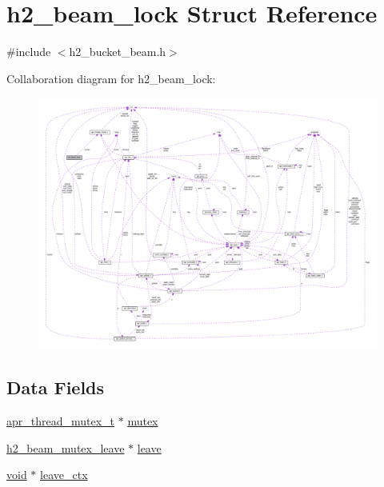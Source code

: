 \hypertarget{structh2__beam__lock}{}\section{h2\+\_\+beam\+\_\+lock Struct Reference}
\label{structh2__beam__lock}


{\ttfamily \#include $<$h2\+\_\+bucket\+\_\+beam.\+h$>$}



Collaboration diagram for h2\+\_\+beam\+\_\+lock\+:
\nopagebreak
\begin{figure}[H]
\begin{center}
\leavevmode
\includegraphics[width=350pt]{structh2__beam__lock__coll__graph}
\end{center}
\end{figure}
\subsection*{Data Fields}
\begin{DoxyCompactItemize}
\item 
\hyperlink{structapr__thread__mutex__t}{apr\+\_\+thread\+\_\+mutex\+\_\+t} $\ast$ \hyperlink{structh2__beam__lock_a7c133e17917c7c200909e0670e8bdb9a}{mutex}
\item 
\hyperlink{h2__bucket__beam_8h_ae507ef327d6805777c76f2fcb008ed28}{h2\+\_\+beam\+\_\+mutex\+\_\+leave} $\ast$ \hyperlink{structh2__beam__lock_a83a115cf871f1df4a5ac961194bca84b}{leave}
\item 
\hyperlink{group__MOD__ISAPI_gacd6cdbf73df3d9eed42fa493d9b621a6}{void} $\ast$ \hyperlink{structh2__beam__lock_a471b5abe93ba44f242155423d4f1efa5}{leave\+\_\+ctx}
\end{DoxyCompactItemize}


